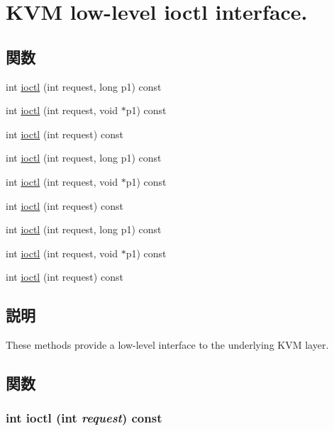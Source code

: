 \hypertarget{group__KvmIoctl}{
\section{KVM low-\/level ioctl interface.}
\label{group__KvmIoctl}
}
\subsection*{関数}
\begin{DoxyCompactItemize}
\item 
int \hyperlink{group__KvmIoctl_ga106fe09b5e87d6c14884f8ffff7b338a}{ioctl} (int request, long p1) const 
\item 
int \hyperlink{group__KvmIoctl_ga89db87cb31fe2ba732de8fa68c8bd1f1}{ioctl} (int request, void $\ast$p1) const 
\item 
int \hyperlink{group__KvmIoctl_ga32cd3b0742689c29c9ab9e3e03feb5f2}{ioctl} (int request) const 
\item 
int \hyperlink{group__KvmIoctl_ga106fe09b5e87d6c14884f8ffff7b338a}{ioctl} (int request, long p1) const 
\item 
int \hyperlink{group__KvmIoctl_ga89db87cb31fe2ba732de8fa68c8bd1f1}{ioctl} (int request, void $\ast$p1) const 
\item 
int \hyperlink{group__KvmIoctl_ga32cd3b0742689c29c9ab9e3e03feb5f2}{ioctl} (int request) const 
\item 
int \hyperlink{group__KvmIoctl_ga106fe09b5e87d6c14884f8ffff7b338a}{ioctl} (int request, long p1) const 
\item 
int \hyperlink{group__KvmIoctl_ga89db87cb31fe2ba732de8fa68c8bd1f1}{ioctl} (int request, void $\ast$p1) const 
\item 
int \hyperlink{group__KvmIoctl_ga32cd3b0742689c29c9ab9e3e03feb5f2}{ioctl} (int request) const 
\end{DoxyCompactItemize}


\subsection{説明}
These methods provide a low-\/level interface to the underlying KVM layer. 

\subsection{関数}
\hypertarget{group__KvmIoctl_ga32cd3b0742689c29c9ab9e3e03feb5f2}{
\subsubsection[{ioctl}]{\setlength{\rightskip}{0pt plus 5cm}int ioctl (int {\em request}) const}}
\label{group__KvmIoctl_ga32cd3b0742689c29c9ab9e3e03feb5f2}



